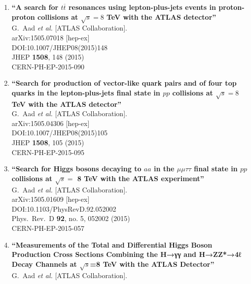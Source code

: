 \documentclass{article}
\begin{document}
\begin{enumerate}
\item%
{\bf ``A search for $ t\overline{t} $ resonances using lepton-plus-jets events in proton-proton collisions at $ \sqrt{s}=8 $ TeV with the ATLAS detector''}
  \\{}G.~Aad {\it et al.} [ATLAS Collaboration].
  \\{}arXiv:1505.07018 [hep-ex]
  \\{}DOI:10.1007/JHEP08(2015)148
  \\{}JHEP {\bf 1508}, 148 (2015)
  \\{}CERN-PH-EP-2015-090
\item%
{\bf ``Search for production of vector-like quark pairs and of four top quarks in the lepton-plus-jets final state in $pp$ collisions at $\sqrt{s}=8$ TeV with the ATLAS detector''}
  \\{}G.~Aad {\it et al.} [ATLAS Collaboration].
  \\{}arXiv:1505.04306 [hep-ex]
  \\{}DOI:10.1007/JHEP08(2015)105
  \\{}JHEP {\bf 1508}, 105 (2015)
  \\{}CERN-PH-EP-2015-095
\item%
{\bf ``Search for Higgs bosons decaying to $aa$ in the $\mu\mu\tau\tau$ final state in $pp$ collisions at $\sqrt{s} = $ 8 TeV with the ATLAS experiment''}
  \\{}G.~Aad {\it et al.} [ATLAS Collaboration].
  \\{}arXiv:1505.01609 [hep-ex]
  \\{}DOI:10.1103/PhysRevD.92.052002
  \\{}Phys.\ Rev.\ D {\bf 92}, no. 5, 052002 (2015)
  \\{}CERN-PH-EP-2015-057
\item%
{\bf ``Measurements of the Total and Differential Higgs Boson Production Cross Sections Combining the H→γγ and H→ZZ*→4ℓ Decay Channels at $\sqrt{s}$=8  TeV with the ATLAS Detector''}
  \\{}G.~Aad {\it et al.} [ATLAS Collaboration].

\end{enumerate}
\end{document}

